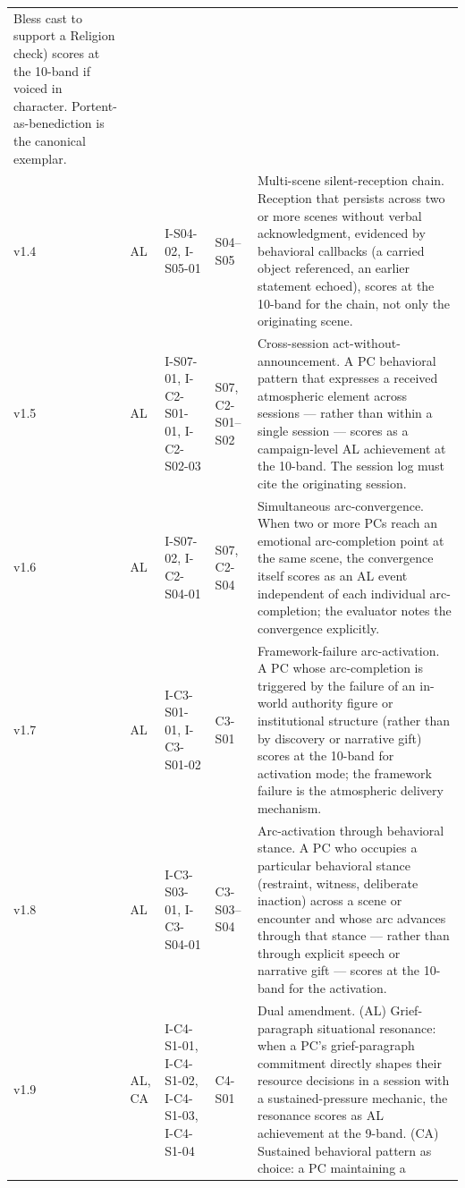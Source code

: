 \begin{table}[t]
\begin{tabular}{@{}p{0.9cm}p{1.2cm}p{3.0cm}p{3.2cm}p{5.0cm}@{}}
  Bless cast to support a Religion check) scores at the 10-band if voiced in
  character. Portent-as-benediction is the canonical exemplar. \\
\addlinespace[2pt]
v1.4 & AL & I-S04-02, I-S05-01 & S04--S05 & Multi-scene silent-reception chain.
  Reception that persists across two or more scenes without verbal acknowledgment,
  evidenced by behavioral callbacks (a carried object referenced, an earlier
  statement echoed), scores at the 10-band for the chain, not only the originating
  scene. \\
\addlinespace[2pt]
v1.5 & AL & I-S07-01, I-C2-S01-01, I-C2-S02-03 & S07, C2-S01--S02 &
  Cross-session act-without-announcement. A PC behavioral pattern that expresses
  a received atmospheric element across sessions --- rather than within a single
  session --- scores as a campaign-level AL achievement at the 10-band. The
  session log must cite the originating session. \\
\addlinespace[2pt]
v1.6 & AL & I-S07-02, I-C2-S04-01 & S07, C2-S04 & Simultaneous arc-convergence.
  When two or more PCs reach an emotional arc-completion point at the same scene,
  the convergence itself scores as an AL event independent of each individual
  arc-completion; the evaluator notes the convergence explicitly. \\
\addlinespace[2pt]
v1.7 & AL & I-C3-S01-01, I-C3-S01-02 & C3-S01 & Framework-failure arc-activation.
  A PC whose arc-completion is triggered by the failure of an in-world authority
  figure or institutional structure (rather than by discovery or narrative gift)
  scores at the 10-band for activation mode; the framework failure is the
  atmospheric delivery mechanism. \\
\addlinespace[2pt]
v1.8 & AL & I-C3-S03-01, I-C3-S04-01 & C3-S03--S04 & Arc-activation through
  behavioral stance. A PC who occupies a particular behavioral stance (restraint,
  witness, deliberate inaction) across a scene or encounter and whose arc advances
  through that stance --- rather than through explicit speech or narrative gift ---
  scores at the 10-band for the activation. \\
\addlinespace[2pt]
v1.9 & AL, CA & I-C4-S1-01, I-C4-S1-02, I-C4-S1-03, I-C4-S1-04 & C4-S01 &
  Dual amendment. (AL) Grief-paragraph situational resonance: when a PC's
  grief-paragraph commitment directly shapes their resource decisions in a session
  with a sustained-pressure mechanic, the resonance scores as AL achievement at
  the 9-band. (CA) Sustained behavioral pattern as choice: a PC maintaining a

\end{tabular}
\end{table}
